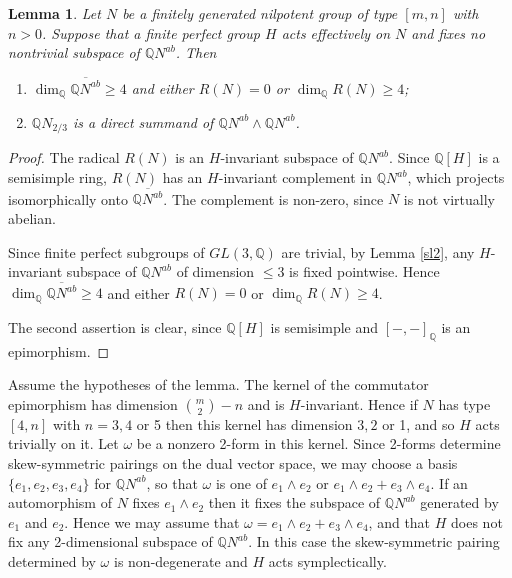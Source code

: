 \documentclass[12pt]{amsart}
\renewcommand{\geq}{\geqslant}
\renewcommand{\leq}{\leqslant}
\newtheorem{lemma}[theorem]{Lemma}
\begin{document}
\begin{lemma}
\label{rad dim}
Let $N$ be a finitely generated nilpotent group of type $[m,n]$ with $n>0$.
Suppose that a finite perfect group $H$ acts effectively on $N$ 
and fixes no nontrivial subspace of $\mathbb{Q}N^{ab}$.
Then
\begin{enumerate}
\item$\dim_\mathbb{Q}\overline{\mathbb{Q}N^{ab}}\ge4$ and either $R(N)=0$ 
or $\dim_\mathbb{Q}R(N)\geq4$;
\item$\mathbb{Q}N_{2/3}$ is a direct summand of
$\mathbb{Q}N^{ab}\wedge\mathbb{Q}N^{ab}$.
\end{enumerate}
\end{lemma}

\begin{proof}
The radical $R(N)$ is an $H$-invariant subspace of $\mathbb{Q}N^{ab}$.
Since $\mathbb{Q}[H]$ is a semisimple ring,
$R(N)$ has an $H$-invariant complement in $\mathbb{Q}N^{ab}$, 
which projects isomorphically onto $\overline{\mathbb{Q}N^{ab}}$.
The complement is non-zero, since $N$ is not virtually abelian.

Since finite perfect subgroups of $GL(3,\mathbb{Q})$ are trivial,
by Lemma \ref{sl2},
any $H$-invariant subspace of $\mathbb{Q}N^{ab}$ of dimension $\leq3$
is fixed pointwise.
Hence $\dim_\mathbb{Q}\overline{\mathbb{Q}N^{ab}}\ge4$
and either $R(N)=0$ or $\dim_\mathbb{Q}R(N)\geq4$.

The second assertion is clear, since $\mathbb{Q}[H]$ is semisimple and 
$[-,-]_\mathbb{Q}$ is an epimorphism.
\end{proof}

Assume the hypotheses of the lemma.
The kernel of the commutator epimorphism has dimension 
$\binom{m}2-n$ and is $H$-invariant. 
Hence if $N$ has type $[4,n]$ with $n=3,4$ or 5 then this kernel 
has dimension $3,2$ or 1,  and so $H$ acts trivially on it.
Let $\omega$ be a nonzero 2-form in this kernel.
Since 2-forms determine skew-symmetric pairings on the dual vector space,
we  may choose a basis $\{e_1,e_2,e_3,e_4\}$ for $\mathbb{Q}N^{ab}$, 
so that $\omega$ is one of $e_1\wedge{e_2}$ or 
$e_1\wedge{e_2}+e_3\wedge{e_4}$.
If an automorphism of $N$ fixes $e_1\wedge{e_2}$ then it fixes 
the subspace of $\mathbb{Q}{N^{ab}}$ generated by $e_1$ and $e_2$.
Hence we may assume that $\omega=e_1\wedge{e_2}+e_3\wedge{e_4}$,
and that $H$ does not fix any 2-dimensional subspace of
$\mathbb{Q}N^{ab}$.
In this case the skew-symmetric pairing determined by $\omega$
is non-degenerate and $H$ acts symplectically.
\end{document}
